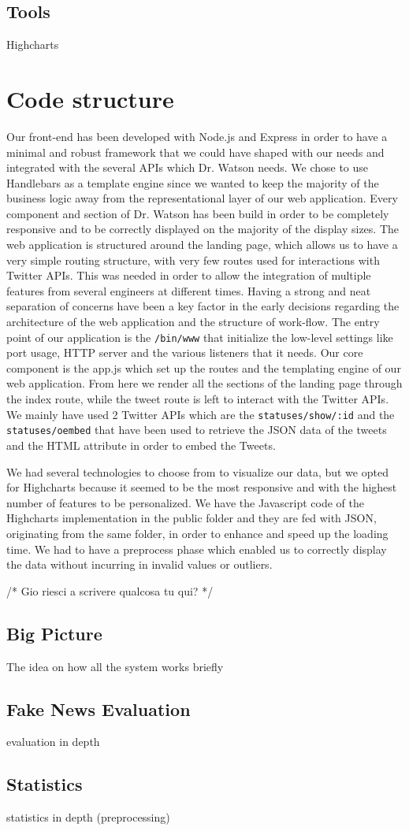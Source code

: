 \subsection{Tools}
Highcharts

\section{Code structure}
Our front-end has been developed with Node.js and Express in order to have a minimal and robust framework that we could have shaped with our needs and integrated with the several APIs which Dr. Watson needs.
We chose to use Handlebars as a template engine since we wanted to keep the majority of the business logic away from the representational layer of our web application. 
Every component and section of Dr. Watson has been build in order to be completely responsive and to be correctly displayed on the majority of the display sizes.
The web application is structured around the landing page, which allows us to have a very simple routing structure, with very few routes used for interactions with Twitter APIs.
This was needed in order to allow the integration of multiple features from several engineers at different times. Having a strong and neat separation of concerns have been a key factor in the early decisions regarding the architecture of the web application and the structure of work-flow.
The entry point of our application is the \verb|/bin/www| that initialize the low-level settings like port usage, HTTP server and the various listeners that it needs. Our core component is the app.js which set up the routes and the templating engine of our web application. 
From here we render all the sections of the landing page through the index route, while the tweet route is left to interact with the Twitter APIs. We mainly have used 2 Twitter APIs which are the \verb|statuses/show/:id| and the \verb|statuses/oembed| that have been used to retrieve the JSON data of the tweets and the HTML attribute in order to embed the Tweets.

We had several technologies to choose from to visualize our data, but we opted for Highcharts because it seemed to be the most responsive and with the highest number of features to be personalized. 
We have the Javascript code of the Highcharts implementation in the public folder and they are fed with JSON, originating from the same folder, in order to enhance and speed up the loading time.
We had to have a preprocess phase which enabled us to correctly display the data without incurring in invalid values or outliers.

/*
Gio riesci a scrivere qualcosa tu qui?
*/

\subsection{Big Picture}
The idea on how all the system works briefly

\subsection{Fake News Evaluation}
evaluation in depth

\subsection{Statistics}
statistics in depth (preprocessing)